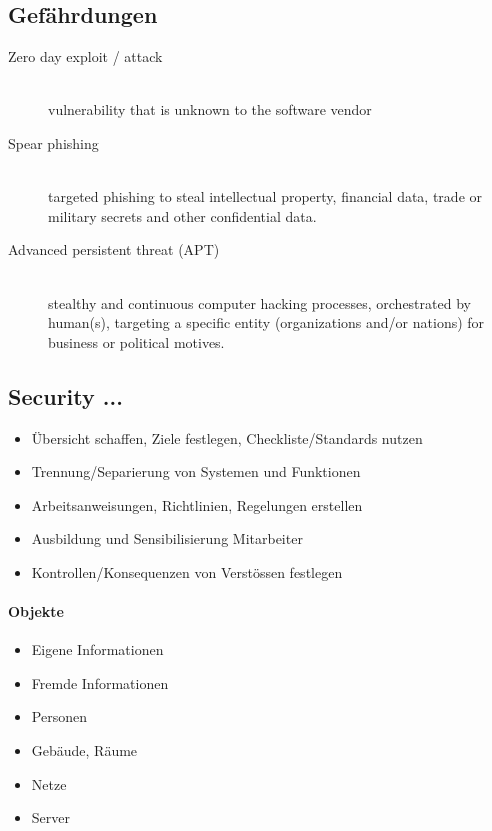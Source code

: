 \subsection{Gefährdungen}
\begin{description}
\item[Zero day exploit / attack] \hfill \\
	vulnerability that is unknown to the software vendor
\item[Spear phishing] \hfill \\
	targeted phishing to steal intellectual property, financial data, trade or military secrets and other confidential data.
\item[Advanced persistent threat (APT)] \hfill \\
	stealthy and continuous computer hacking processes, orchestrated by human(s), targeting a specific entity (organizations and/or nations) for business or political motives.
\end{description}

\subsection{Security ...}

 \begin{itemize}
 	\item Übersicht schaffen, Ziele festlegen, Checkliste/Standards nutzen
 	\item Trennung/Separierung von Systemen und Funktionen
 	\item Arbeitsanweisungen, Richtlinien, Regelungen erstellen
 	\item Ausbildung und Sensibilisierung Mitarbeiter
 	\item Kontrollen/Konsequenzen von Verstössen festlegen
 \end{itemize}

\paragraph{Objekte}
	\begin{itemize}
		\item Eigene Informationen
		\item Fremde Informationen
		\item Personen
		\item Gebäude, Räume
		\item Netze
		\item Server
	\end{itemize}

